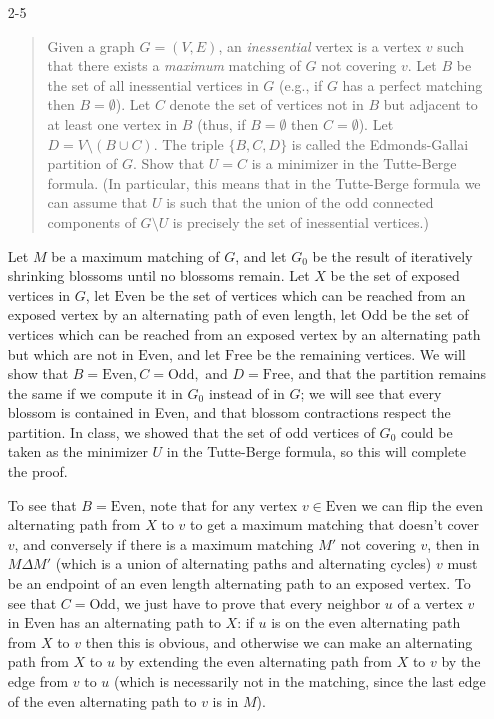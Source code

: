 \documentclass[12pt]{article}
\begin{document}
\begin{enumerate}
\item[2-5]
\begin{quote}
Given a graph $G=(V,E)$, an {\it inessential} vertex is a vertex $v$
such that there exists a {\it maximum} matching of $G$ not covering
$v$. Let $B$ be the set of all inessential vertices in $G$ (e.g., if
$G$ has a perfect matching then $B=\emptyset$). Let $C$ denote the set
of vertices not in $B$ but adjacent to at least one vertex in $B$
(thus, if $B=\emptyset$ then $C=\emptyset$). Let $D=V\setminus (B\cup
C)$. The triple $\{B, C, D\}$ is called the Edmonds-Gallai partition
of $G$. Show that $U=C$ is a minimizer in the Tutte-Berge formula. (In
particular, this means that in the Tutte-Berge formula we can assume
that $U$ is such that the union of the odd connected components of
$G\setminus U$ is precisely the set of inessential vertices.)
\end{quote}

Let $M$ be a maximum matching of $G$, and let $G_0$ be the result of iteratively shrinking blossoms until no blossoms remain. Let $X$ be the set of exposed vertices in $G$, let $\mbox{Even}$ be the set of vertices which can be reached from an exposed vertex by an alternating path of even length, let $\mbox{Odd}$ be the set of vertices which can be reached from an exposed vertex by an alternating path but which are not in $\mbox{Even}$, and let $\mbox{Free}$ be the remaining vertices. We will show that $B = \mbox{Even}, C = \mbox{Odd},$ and $D = \mbox{Free}$, and that the partition remains the same if we compute it in $G_0$ instead of in $G$; we will see that every blossom is contained in \mbox{Even}, and that blossom contractions respect the partition. In class, we showed that the set of odd vertices of $G_0$ could be taken as the minimizer $U$ in the Tutte-Berge formula, so this will complete the proof.

To see that $B = \mbox{Even}$, note that for any vertex $v \in \mbox{Even}$ we can flip the even alternating path from $X$ to $v$ to get a maximum matching that doesn't cover $v$, and conversely if there is a maximum matching $M'$ not covering $v$, then in $M\Delta M'$ (which is a union of alternating paths and alternating cycles) $v$ must be an endpoint of an even length alternating path to an exposed vertex. To see that $C = \mbox{Odd}$, we just have to prove that every neighbor $u$ of a vertex $v$ in $\mbox{Even}$ has an alternating path to $X$: if $u$ is on the even alternating path from $X$ to $v$ then this is obvious, and otherwise we can make an alternating path from $X$ to $u$ by extending the even alternating path from $X$ to $v$ by the edge from $v$ to $u$ (which is necessarily not in the matching, since the last edge of the even alternating path to $v$ is in $M$).


\end{enumerate}
\end{document}
